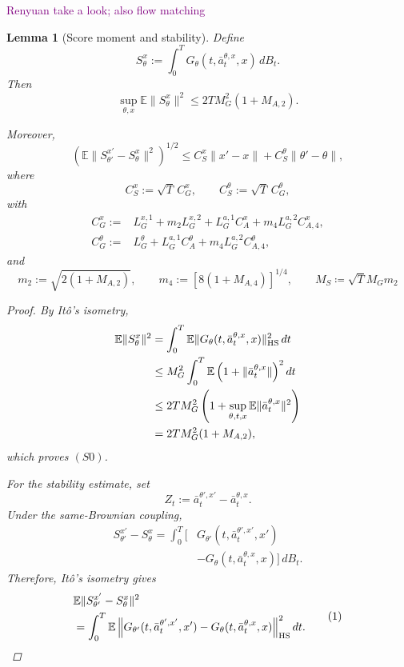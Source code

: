\documentclass{article}
\newtheorem{lem}[thm]{Lemma}
\theoremstyle{definition}
\theoremstyle{remark}
\theoremstyle{mystyle}
\newcommand{\1}{\mathbbm{1}}
\begin{document}
\textcolor{purple}{Renyuan take a look; also flow matching}
\begin{lem}[Score moment and stability]
Define
\[
S_\theta^x
:=
\int_0^T
G_\theta(t,\bar a_t^{\theta,x},x)\,dB_t.
\]
Then
\[
\sup_{\theta,x}
\mathbb E\|S_\theta^x\|^2
\le
2TM_G^2(1+M_{A,2}).
\tag{S0}
\]

Moreover,
\[
\left(
\mathbb E
\|S_{\theta'}^{x'}-S_\theta^x\|^2
\right)^{1/2}
\le
C_S^x\|x'-x\|
+
C_S^\theta\|\theta'-\theta\|,
\tag{S1}
\]
where
\[
C_S^x:=\sqrt{T}\,C_G^x,
\qquad
C_S^\theta:=\sqrt{T}\,C_G^\theta,
\]
with
\[
\begin{aligned}
C_G^x
:={}&
L_G^{x,1}
+
m_2L_G^{x,2}
+
L_G^{a,1}C_A^x
+
m_4L_G^{a,2}C_{A,4}^x,\\
C_G^\theta
:={}&
L_G^\theta
+
L_G^{a,1}C_A^\theta
+
m_4L_G^{a,2}C_{A,4}^\theta,
\end{aligned}
\tag{S2}
\]
and
\[
m_2:=\sqrt{2(1+M_{A,2})},
\qquad
m_4:=\left[8(1+M_{A,4})\right]^{1/4}
,\qquad M_S\coloneqq\sqrt{T}M_Gm_2\]

\begin{proof}
By It\^o's isometry,
\[
\begin{aligned}
\mathbb E\|S_\theta^x\|^2
&=
\int_0^T
\mathbb E
\|G_\theta(t,\bar a_t^{\theta,x},x)\|_{\rm HS}^2\,dt\\
&\le
M_G^2
\int_0^T
\mathbb E
\left(1+\|\bar a_t^{\theta,x}\|\right)^2dt\\
&\le
2TM_G^2
\left(
1+
\sup_{\theta,t,x}
\mathbb E\|\bar a_t^{\theta,x}\|^2
\right)\\
&=
2TM_G^2(1+M_{A,2}),
\end{aligned}
\]
which proves \((S0)\).

For the stability estimate, set
\[
Z_t
:=
\bar a_t^{\theta',x'}-\bar a_t^{\theta,x}.
\]
Under the same-Brownian coupling,
\[
\begin{aligned}
S_{\theta'}^{x'}-S_\theta^x
=
\int_0^T
\Big[
&G_{\theta'}(t,\bar a_t^{\theta',x'},x')\\
&-
G_\theta(t,\bar a_t^{\theta,x},x)
\Big]\,dB_t.
\end{aligned}
\]
Therefore, It\^o's isometry gives
\[
\begin{aligned}
&
\mathbb E
\|S_{\theta'}^{x'}-S_\theta^x\|^2\\
&=
\int_0^T
\mathbb E
\left\|
G_{\theta'}(t,\bar a_t^{\theta',x'},x')
-
G_\theta(t,\bar a_t^{\theta,x},x)
\right\|_{\rm HS}^2dt.
\end{aligned}
\tag{1}
\]


\end{proof}
\end{lem}
\end{document}
